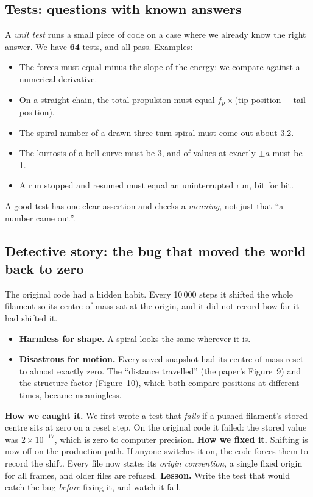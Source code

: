 \documentclass[11pt]{article}
\begin{document}
\subsection{Tests: questions with known answers}
A \emph{unit test} runs a small piece of code on a case where we already know the right answer. We have \textbf{64} tests, and all pass. Examples:
\begin{itemize}
\item The forces must equal minus the slope of the energy: we compare against a numerical derivative.
\item On a straight chain, the total propulsion must equal $f_p\times$(tip position $-$ tail position).
\item The spiral number of a drawn three-turn spiral must come out about 3.2.
\item The kurtosis of a bell curve must be 3, and of values at exactly $\pm a$ must be 1.
\item A run stopped and resumed must equal an uninterrupted run, bit for bit.
\end{itemize}
A good test has one clear assertion and checks a \emph{meaning}, not just that ``a number came out''.

\subsection{Detective story: the bug that moved the world back to zero}\label{sec:b-bug}
The original code had a hidden habit. Every 10\,000 steps it shifted the whole filament so its centre of mass sat at the origin, and it did not record how far it had shifted it.
\begin{itemize}
\item \textbf{Harmless for shape.} A spiral looks the same wherever it is.
\item \textbf{Disastrous for motion.} Every saved snapshot had its centre of mass reset to almost exactly zero. The ``distance travelled'' (the paper's Figure~9) and the structure factor (Figure~10), which both compare positions at different times, became meaningless.
\end{itemize}
\textbf{How we caught it.} We first wrote a test that \emph{fails} if a pushed filament's stored centre sits at zero on a reset step. On the original code it failed: the stored value was $2\times10^{-17}$, which is zero to computer precision.
\textbf{How we fixed it.} Shifting is now off on the production path. If anyone switches it on, the code forces them to record the shift. Every file now states its \emph{origin convention}, a single fixed origin for all frames, and older files are refused.
\textbf{Lesson.} Write the test that would catch the bug \emph{before} fixing it, and watch it fail.
\end{document}
